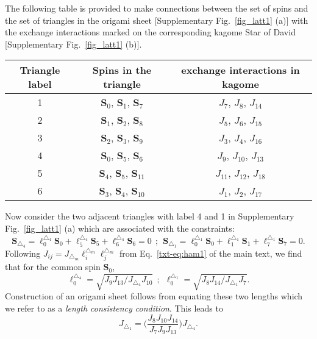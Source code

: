 \documentclass[a4paper,aps,prl,floatfix,showpacs,superscriptaddress,notitlepage]{revtex4-1}
\def\spin{\mathbf{S}} %
\begin{document}
The following table is provided to make connections between the set of spins and the set of triangles in the origami sheet [Supplementary Fig.~\ref{fig_latt1} (a)] with the exchange interactions marked on the corresponding kagome Star of David [Supplementary Fig.~\ref{fig_latt1} (b)].
\begin{center}
 \begin{tabular}{|c|c|c|} 
 \hline
 Triangle label & Spins in the triangle & exchange interactions in kagome \\  
 \hline
 1 & $\spin_0$, $\spin_1$, $\spin_7$ & $J_7$, $J_{8}$, $J_{14}$ \\
 \hline
 2 & $\spin_1$, $\spin_2$, $\spin_8$ & $J_5$, $J_{6}$, $J_{15}$  \\
 \hline
 3 & $\spin_2$, $\spin_3$, $\spin_9$ & $J_3$, $J_{4}$, $J_{16}$  \\
 \hline
 4 & $\spin_0$, $\spin_5$, $\spin_{6}$ & $J_9$, $J_{10}$, $J_{13}$  \\
 \hline
 5 & $\spin_4$, $\spin_5$, $\spin_{11}$ & $J_{11}$, $J_{12}$, $J_{18}$  \\  
 \hline
 6 & $\spin_3$, $\spin_4$, $\spin_{10}$ & $J_{1}$, $J_{2}$, $J_{17}$  \\  
 \hline
\end{tabular}
\end{center}
Now consider the two adjacent triangles with label 4 and 1 in Supplementary Fig.~\ref{fig_latt1} (a) which are associated with the constraints:
\begin{equation}
\spin_{\triangle_4} = \ell^{\triangle_4}_0 \spin_0 + \ell^{\triangle_4}_5 \spin_5 + \ell^{\triangle_4}_6 \spin_6 = 0~~;~~\spin_{\triangle_1} = \ell^{\triangle_1}_0 \spin_0 + \ell^{\triangle_1}_1 \spin_1 + \ell^{\triangle_1}_{7} \spin_{7} = 0. 
\end{equation}
Following $J_{ij}=J_{\triangle_m} \ell^{\triangle_m}_i\ell^{\triangle_m}_j$ from Eq.~\ref{txt-eq:ham1} of the main text, we find that for the common spin $\spin_0$,
\begin{equation}
 \ell^{\triangle_4}_0=\sqrt{J_{9}J_{13}/J_{\triangle_4} J_{10}}~~;~~\ell^{\triangle_1}_0=\sqrt{J_{8}J_{14}/J_{\triangle_1} J_7}.
\end{equation}
Construction of an origami sheet follows from equating these two lengths which we refer to as a {\it length consistency condition}. This leads to 
\begin{equation}
 J_{\triangle_1} = \bigg(\frac{J_8J_{10}J_{14}}{J_7J_9J_{13}}\bigg)J_{\triangle_4}.
 \label{eq:cond1}
\end{equation}
\end{document}

